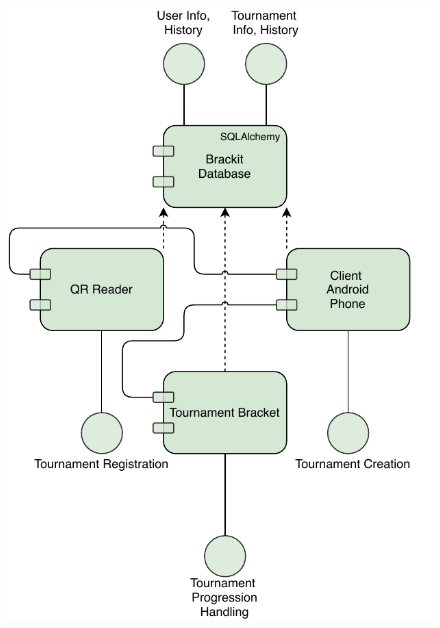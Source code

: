 \documentclass{article}
\begin{document}
\begin{center}
    \begin{figure}[h]
        \centering
        \includegraphics{../plts/d2.pdf}
        \end{figure}
\end{center}
\end{document}
